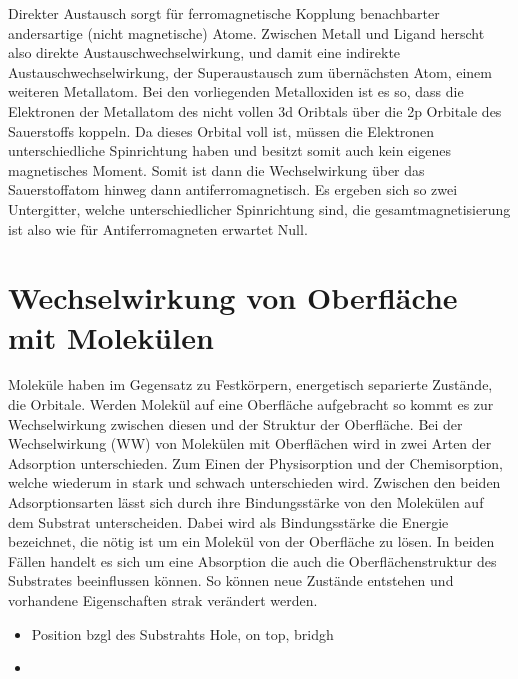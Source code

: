             Direkter Austausch sorgt für ferromagnetische Kopplung benachbarter andersartige (nicht magnetische) Atome.
            Zwischen Metall und Ligand herscht also direkte Austauschwechselwirkung, und damit eine indirekte Austauschwechselwirkung, der Superaustausch zum übernächsten Atom, einem weiteren Metallatom.
            Bei den vorliegenden Metalloxiden ist es so, dass die Elektronen der Metallatom des nicht vollen 3d Oribtals über die 2p Orbitale des Sauerstoffs koppeln.
            Da dieses Orbital voll ist, müssen die Elektronen unterschiedliche Spinrichtung haben und besitzt somit auch kein eigenes magnetisches Moment.
            Somit ist dann die Wechselwirkung über das Sauerstoffatom hinweg dann antiferromagnetisch.
            Es ergeben sich so zwei Untergitter, welche unterschiedlicher Spinrichtung sind, die gesamtmagnetisierung ist also wie für Antiferromagneten erwartet Null.
            
            
    
    \section{Wechselwirkung von Oberfläche mit Molekülen}
        Moleküle haben im Gegensatz zu Festkörpern, energetisch separierte Zustände, die Orbitale.
        Werden Molekül auf eine Oberfläche aufgebracht so kommt es zur Wechselwirkung zwischen diesen und der Struktur der Oberfläche.
        Bei der Wechselwirkung (WW) von Molekülen mit Oberflächen wird in zwei Arten der Adsorption unterschieden. 
        Zum Einen der Physisorption und der Chemisorption, welche wiederum in stark und schwach unterschieden wird.
        Zwischen den beiden Adsorptionsarten lässt sich durch ihre Bindungsstärke von den Molekülen auf dem Substrat unterscheiden.
        Dabei wird als Bindungsstärke die Energie bezeichnet, die nötig ist um ein Molekül von der Oberfläche zu lösen.
        In beiden Fällen handelt es sich um eine Absorption die auch die Oberflächenstruktur des Substrates beeinflussen können.
        So können neue Zustände entstehen und vorhandene Eigenschaften strak verändert werden.
        
        \begin{itemize}
            \item Position bzgl des Substrahts Hole, on top, bridgh
            \item ~\cite{ma-DJ}
        \end{itemize}
        
